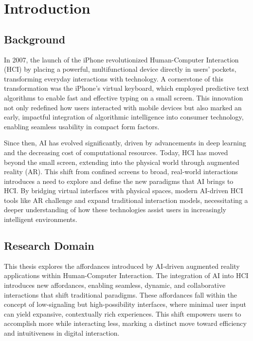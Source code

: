 
\section{Introduction}

\subsection{Background}

In 2007, the launch of the iPhone revolutionized Human-Computer Interaction (HCI) by placing a powerful, multifunctional device directly in users' pockets, transforming everyday interactions with technology.
A cornerstone of this transformation was the iPhone's virtual keyboard, which employed predictive text algorithms to enable fast and effective typing on a small screen.
This innovation not only redefined how users interacted with mobile devices but also marked an early, impactful integration of algorithmic intelligence into consumer technology, enabling seamless usability in compact form factors.

Since then, AI has evolved significantly, driven by advancements in deep learning and the decreasing cost of computational resources.
Today, HCI has moved beyond the small screen, extending into the physical world through augmented reality (AR).
This shift from confined screens to broad, real-world interactions introduces a need to explore and define the new paradigms that AI brings to HCI.
By bridging virtual interfaces with physical spaces, modern AI-driven HCI tools like AR challenge and expand traditional interaction models, necessitating a deeper understanding of how these technologies assist users in increasingly intelligent environments.

\subsection{Research Domain}
This thesis explores the affordances introduced by AI-driven augmented reality applications within Human-Computer Interaction.
The integration of AI into HCI introduces new affordances, enabling seamless, dynamic, and collaborative interactions that shift traditional paradigms.
These affordances fall within the concept of low-signaling but high-possibility interfaces, where minimal user input can yield expansive, contextually rich experiences.
This shift empowers users to accomplish more while interacting less, marking a distinct move toward efficiency and intuitiveness in digital interaction.

